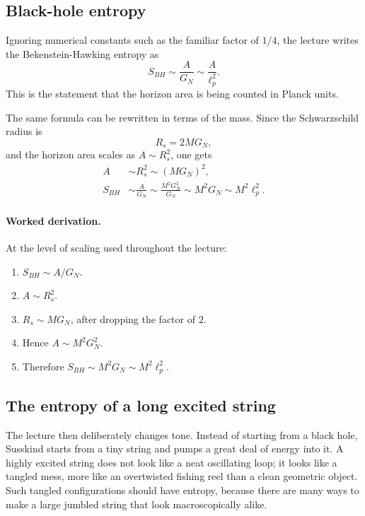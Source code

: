 \subsection{Black-hole entropy}

Ignoring numerical constants such as the familiar factor of \(1/4\), the lecture writes the Bekenstein-Hawking entropy as
\begin{equation}
S_{BH}\sim \frac{A}{G_N}\sim \frac{A}{\ell_p^2}.
\end{equation}
This is the statement that the horizon area is being counted in Planck units.

The same formula can be rewritten in terms of the mass. Since the Schwarzschild radius is
\begin{equation}
R_s=2MG_N,
\end{equation}
and the horizon area scales as \(A\sim R_s^2\), one gets
\begin{align}
A &\sim R_s^2 \sim (MG_N)^2,\\
S_{BH} &\sim \frac{A}{G_N}\sim \frac{M^2G_N^2}{G_N}\sim M^2G_N\sim M^2\ell_p^2.
\end{align}

\paragraph{Worked derivation.}
At the level of scaling used throughout the lecture:
\begin{enumerate}
\item \(S_{BH}\sim A/G_N\).
\item \(A\sim R_s^2\).
\item \(R_s\sim MG_N\), after dropping the factor of \(2\).
\item Hence \(A\sim M^2G_N^2\).
\item Therefore \(S_{BH}\sim M^2G_N\sim M^2\ell_p^2\).
\end{enumerate}

\subsection{The entropy of a long excited string}

The lecture then deliberately changes tone. Instead of starting from a black hole, Susskind starts from a tiny string and pumps a great deal of energy into it. A highly excited string does not look like a neat oscillating loop; it looks like a tangled mess, more like an overtwisted fishing reel than a clean geometric object. Such tangled configurations should have entropy, because there are many ways to make a large jumbled string that look macroscopically alike.

